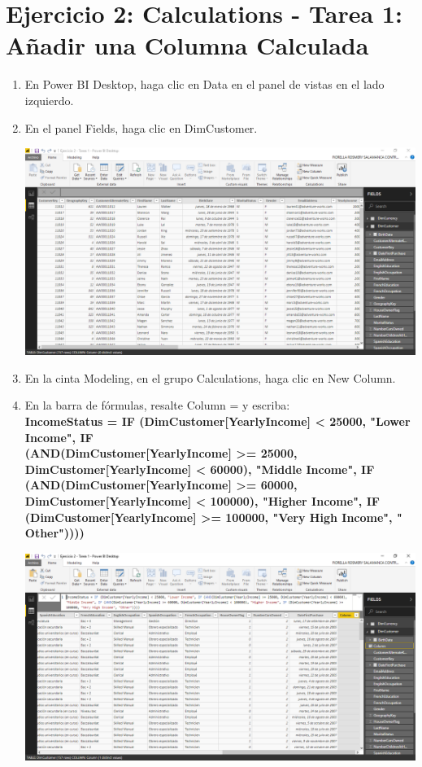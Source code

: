 \section{Ejercicio 2: Calculations - Tarea 1: Añadir una Columna Calculada} 


\begin{enumerate}[1.]
    \item En Power BI Desktop, haga clic en Data en el panel de vistas en el lado izquierdo.
    \item En el panel Fields, haga clic en DimCustomer.

	\begin{center}
	\includegraphics[width=17cm]{./Imagenes/Ejercicio2-Tarea1/1}
	\end{center}	

    \item En la cinta Modeling, en el grupo Calculations, haga clic en New Column.
    \item En la barra de fórmulas, resalte Column = y escriba:\\

\textbf {IncomeStatus = IF (DimCustomer[YearlyIncome] < 25000, "Lower Income", IF \\
(AND(DimCustomer[YearlyIncome] >= 25000, DimCustomer[YearlyIncome] < 60000), "Middle Income", IF\\ (AND(DimCustomer[YearlyIncome] >= 60000, DimCustomer[YearlyIncome] < 100000), "Higher Income", IF\\ (DimCustomer[YearlyIncome] >= 100000, "Very High Income", " Other"))))}\\

	\begin{center}
	\includegraphics[width=17cm]{./Imagenes/Ejercicio2-Tarea1/2}
	\end{center}	


\end{enumerate}

